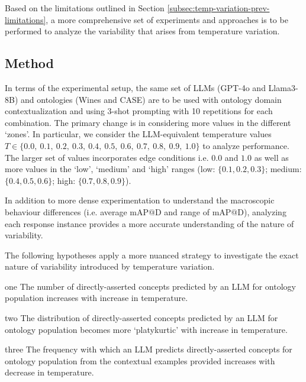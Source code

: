 \documentclass[a4paper,colorinlistoftodos]{article}
\begin{document}
Based on the limitations outlined in Section
\ref{subsec:temp-variation-prev-limitations}, a more comprehensive set of
experiments and approaches is to be performed to analyze the variability that
arises from temperature variation.


\subsection{Method}
\label{subsec:new-temp-variation-method}


In terms of the experimental setup, the same set of LLMs (GPT-4o and
Llama3-8B) and ontologies (Wines and CASE) are to be used with ontology domain
contextualization and using 3-shot prompting with 10 repetitions for each
combination. The primary change is in considering more values in the different
`zones'. In particular, we consider the LLM-equivalent temperature values $T
\in \{0.0,\ 0.1,\ 0.2,\ 0.3,\ 0.4,\ 0.5,\ 0.6,\ 0.7,\ 0.8,\ 0.9,\ 1.0\}$ to
analyze performance. The larger set of values incorporates edge conditions
i.e. $0.0$ and $1.0$ as well as more values in the `low', `medium' and `high'
ranges (low: $\{0.1, 0.2, 0.3\}$; medium: $\{0.4, 0.5, 0.6\}$; high: $\{0.7,
0.8, 0.9\}$).

In addition to more dense experimentation to understand the macroscopic
behaviour differences (i.e. average $\text{mAP@D}$ and range of
$\text{mAP@D}$), analyzing each response instance provides a more accurate
understanding of the nature of variability.

The following hypotheses apply a more nuanced strategy to investigate the
exact nature of variability introduced by temperature variation.

\begin{hypothesis}{}{one}
  The number of directly-asserted concepts predicted by an
  LLM for ontology population increases with increase in temperature.
\end{hypothesis}

\begin{hypothesis}{}{two}
  The distribution of directly-asserted concepts predicted by an LLM for
  ontology population becomes more `platykurtic' with increase in temperature.
\end{hypothesis}

\begin{hypothesis}{}{three}
  The frequency with which an LLM predicts directly-asserted concepts for
  ontology population from the contextual examples provided increases with
  decrease in temperature.
\end{hypothesis}
\end{document}
